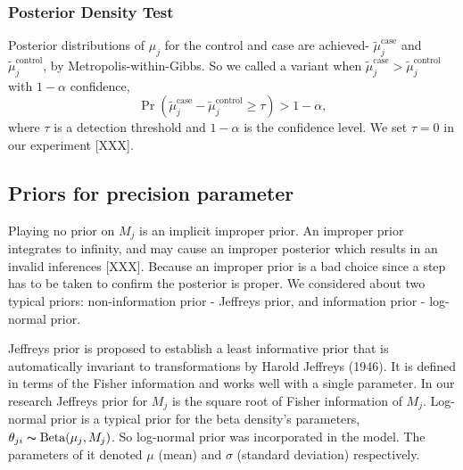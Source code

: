 \documentclass[11pt,reqno]{amsart}
\begin{document}
\subsubsection{Posterior Density Test}\label{sec:hypothesis_test}
Posterior distributions of $\mu_j$ for the control and case are achieved-  $\tilde{\mu}_j^{\text{case}}$ and $\tilde{\mu}_j^{\text{control}}$, by Metropolis-within-Gibbs. So we called a variant when $\tilde{\mu}_j^{\text{case}} > \tilde{\mu}_j^{\text{control}}$ with $1-\alpha$ confidence,
\begin{equation}\label{eqn:bayes_test}
	\Pr( \tilde{\mu}_j^{\text{case}} - \tilde{\mu}_j^{\text{control}} \geq \tau ) > 1-\alpha,
\end{equation}
where $\tau$ is a detection threshold and $1-\alpha$ is the confidence level. We set $\tau = 0$ in our experiment [XXX].


\subsection{Priors for precision parameter}
Playing no prior on $ M_{j}$ is an implicit improper prior. An improper prior integrates to infinity, and may cause an improper posterior which results in an invalid inferences [XXX]. Because an improper prior is a bad choice since a step has to be taken to confirm the posterior is proper. We considered about two typical priors: non-information prior - Jeffreys prior, and information prior - log-normal prior.

Jeffreys prior is proposed to establish a least informative prior that is automatically invariant to transformations by Harold Jeffreys (1946). It is defined in terms of the Fisher information and works well with a single parameter. In our research Jeffreys prior for $M_j$ is the square root of Fisher information of $M_j$. Log-normal prior is a typical prior for the beta density's parameters, $\theta_{ji} \thicksim \text{Beta}(\mu_j, M_j)$. So log-normal prior was incorporated in the model. The parameters of it denoted $\mu$ (mean) and $\sigma$ (standard deviation) respectively.
\end{document}
